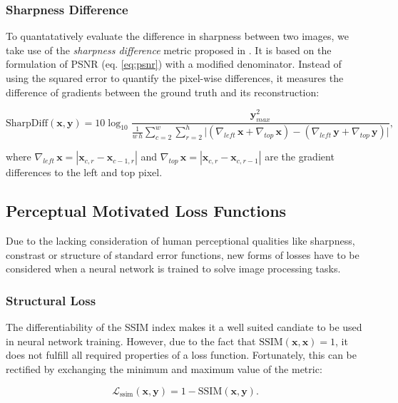\subsubsection*{Sharpness Difference}

To quantatatively evaluate the difference in sharpness between two images, we take use of the \textit{sharpness difference} metric proposed in \parencite{deep_multiscale_video_pred}. It is based on the formulation of PSNR (eq. \ref{eq:psnr}) with a modified denominator. Instead of using the squared error to quantify the pixel-wise differences, it measures the difference of gradients between the ground truth and its reconstruction:

\begin{equation} \label{eq:sharpdiff}
\textrm{SharpDiff}(\textbf{x}, \textbf{y}) = 10 \log_{10} \frac{\textbf{y}_{max}^2}{\frac{1}{w \, h} \sum_{c=2}^{w} \sum_{r=2}^{h} \big|(\nabla_{left} \, \textbf{x} + \nabla_{top} \, \textbf{x})-(\nabla_{left} \, \textbf{y} + \nabla_{top} \, \textbf{y})\big|} ,
\end{equation}

where $ \nabla_{left} \, \textbf{x} = |\textbf{x}_{c,r} - \textbf{x}_{c-1, r}| $ and $ \nabla_{top} \, \textbf{x} = |\textbf{x}_{c,r} - \textbf{x}_{c, r-1}| $ are the gradient differences to the left and top pixel.

\subsection{Perceptual Motivated Loss Functions}

Due to the lacking consideration of human perceptional qualities like sharpness, constrast or structure of standard error functions, new forms of losses have to be considered when a neural network is trained to solve image processing tasks.

\subsubsection*{Structural Loss}

The differentiability of the SSIM index makes it a well suited candiate to be used in neural network training. However, due to the fact that $ \textrm{SSIM}(\textbf{x}, \textbf{x}) = 1 $, it does not fulfill all required properties  of a loss function. Fortunately, this can be rectified by exchanging the minimum and maximum value of the metric:

\begin{equation} \label{eq:sharpdiff}
\mathcal{L}_{\textrm{ssim}}(\textbf{x}, \textbf{y}) = 1 - \textrm{SSIM}(\textbf{x}, \textbf{y}).
\end{equation}

